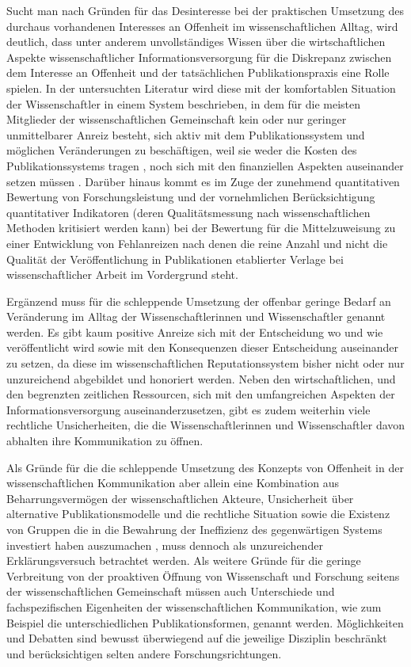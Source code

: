 Sucht man nach Gründen für das Desinteresse bei der praktischen Umsetzung des durchaus vorhandenen Interesses an Offenheit im wissenschaftlichen Alltag, wird deutlich, dass unter anderem unvollständiges Wissen über die wirtschaftlichen Aspekte wissenschaftlicher Informationsversorgung für die Diskrepanz zwischen dem Interesse an Offenheit und der tatsächlichen Publikationspraxis eine Rolle spielen. In der untersuchten Literatur wird diese mit der komfortablen Situation der Wissenschaftler in einem System beschrieben, in dem für die meisten Mitglieder der wissenschaftlichen Gemeinschaft kein oder nur geringer unmittelbarer Anreiz besteht, sich aktiv mit dem Publikationssystem und möglichen Veränderungen zu beschäftigen, weil sie weder die Kosten des Publikationssystems tragen \cite{Sietmann_oa_2007}, noch sich mit den finanziellen Aspekten auseinander setzen müssen \cite{herb_2010}. Darüber hinaus kommt es im Zuge der zunehmend quantitativen Bewertung von Forschungsleistung und der vornehmlichen Berücksichtigung quantitativer Indikatoren (deren Qualitätsmessung nach wissenschaftlichen Methoden kritisiert werden kann) bei der Bewertung für die Mittelzuweisung zu einer Entwicklung von Fehlanreizen nach denen die reine Anzahl und nicht die Qualität der Veröffentlichung in Publikationen etablierter Verlage bei wissenschaftlicher Arbeit im Vordergrund steht.

Ergänzend muss für die schleppende Umsetzung der offenbar geringe Bedarf an Veränderung im Alltag der Wissenschaftlerinnen und Wissenschaftler genannt werden. Es gibt kaum positive Anreize sich mit der Entscheidung wo und wie veröffentlicht wird sowie mit den Konsequenzen dieser Entscheidung auseinander zu setzen, da diese im wissenschaftlichen Reputationssystem bisher nicht oder nur unzureichend abgebildet und honoriert werden. Neben den wirtschaftlichen, und den begrenzten zeitlichen Ressourcen, sich mit den umfangreichen Aspekten der Informationsversorgung auseinanderzusetzen, gibt es zudem weiterhin viele rechtliche Unsicherheiten, die die Wissenschaftlerinnen und Wissenschaftler davon abhalten ihre Kommunikation zu öffnen.

Als Gründe für die die schleppende Umsetzung des Konzepts von Offenheit in der wissenschaftlichen Kommunikation aber allein eine Kombination aus Beharrungsvermögen der wissenschaftlichen Akteure, Unsicherheit über alternative Publikationsmodelle und die rechtliche Situation sowie die Existenz von Gruppen die in die Bewahrung der Ineffizienz des gegenwärtigen Systems investiert haben auszumachen \cite{nosek_2012_scientific}, muss dennoch als unzureichender Erklärungsversuch betrachtet werden. Als weitere Gründe für die geringe Verbreitung von der proaktiven Öffnung von Wissenschaft und Forschung seitens der wissenschaftlichen Gemeinschaft müssen auch Unterschiede und fachspezifischen Eigenheiten der wissenschaftlichen Kommunikation, wie zum Beispiel die unterschiedlichen Publikationsformen, genannt werden. Möglichkeiten und Debatten sind bewusst überwiegend auf die jeweilige Disziplin beschränkt und berücksichtigen selten andere Forschungsrichtungen.

